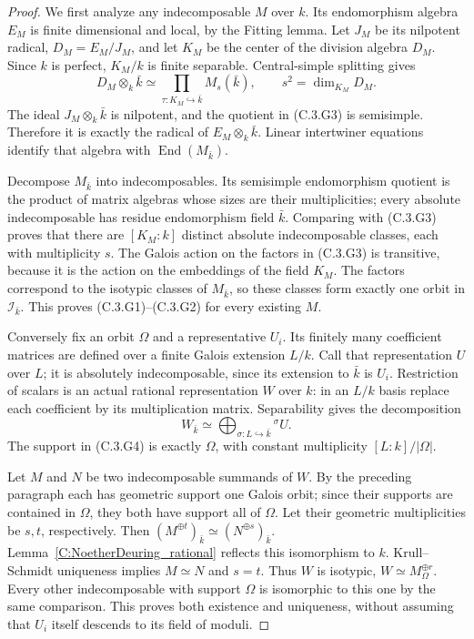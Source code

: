 \begin{proof}
We first analyze any indecomposable $M$ over $k$. Its endomorphism
algebra $E_M$ is finite dimensional and local, by the Fitting lemma.
Let $J_M$ be its nilpotent radical, $D_M=E_M/J_M$, and let $K_M$
be the center of the division algebra $D_M$. Since $k$ is perfect,
$K_M/k$ is finite separable. Central-simple splitting
\cite[Lemma 11.8.6, Tag 0753]{C-StacksPerfectDescent} gives
\[
 D_M\otimes_k\bar k
   \simeq\prod_{\tau:K_M\hookrightarrow\bar k}M_s(\bar k),
       \qquad s^2=\dim_{K_M}D_M.
                                                        \tag{C.3.G3}
\]
The ideal $J_M\otimes_k\bar k$ is nilpotent, and the quotient
in (C.3.G3) is semisimple. Therefore it is exactly the radical
of $E_M\otimes_k\bar k$. Linear intertwiner equations identify
that algebra with $\operatorname{End}(M_{\bar k})$.

Decompose $M_{\bar k}$ into indecomposables. Its semisimple
endomorphism quotient is the product of matrix algebras whose
sizes are their multiplicities; every absolute indecomposable
has residue endomorphism field $\bar k$.
Comparing with (C.3.G3) proves that there are $[K_M:k]$ distinct
absolute indecomposable classes, each with multiplicity $s$.
The Galois action on the factors in (C.3.G3) is transitive,
because it is the action on the embeddings of the field $K_M$.
The factors correspond to the isotypic classes of $M_{\bar k}$,
so these classes form exactly one orbit in $\mathscr I_{\bar k}$.
This proves (C.3.G1)--(C.3.G2) for every existing $M$.

Conversely fix an orbit $\Omega$ and a representative $U_i$.
Its finitely many coefficient matrices are defined over a finite
Galois extension $L/k$. Call that representation $U$ over $L$;
it is absolutely indecomposable, since its extension to $\bar k$
is $U_i$. Restriction of scalars is an actual rational representation
$W$ over $k$: in an $L/k$ basis replace each coefficient by its
multiplication matrix. Separability gives the decomposition
\[
 W_{\bar k}\simeq
       \bigoplus_{\sigma:L\hookrightarrow\bar k}{}^\sigma U.
                                                        \tag{C.3.G4}
\]
The support in (C.3.G4) is exactly $\Omega$, with constant
multiplicity $[L:k]/|\Omega|$.

Let $M$ and $N$ be two indecomposable summands of $W$.
By the preceding paragraph each has geometric support one
Galois orbit; since their supports are contained in $\Omega$,
they both have support all of $\Omega$.
Let their geometric multiplicities be $s,t$, respectively.
Then $(M^{\oplus t})_{\bar k}\simeq(N^{\oplus s})_{\bar k}$.
Lemma~\ref{C:NoetherDeuring_rational} reflects this isomorphism
to $k$. Krull--Schmidt uniqueness implies $M\simeq N$ and
$s=t$. Thus $W$ is isotypic, $W\simeq M_\Omega^{\oplus r}$.
Every other indecomposable with support $\Omega$ is isomorphic
to this one by the same comparison. This proves both existence
and uniqueness, without assuming that $U_i$ itself descends
to its field of moduli.


\end{proof}
